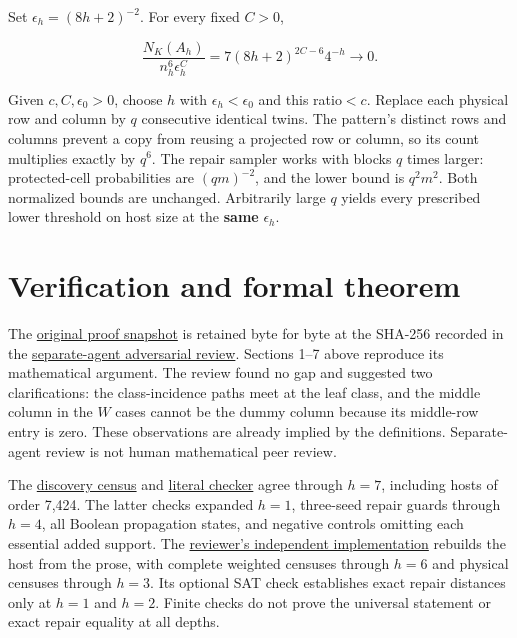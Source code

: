 \documentclass[11pt,letterpaper]{article}
\begin{document}
Set \(\epsilon _h=(8h+2)^{-2}\). For every fixed \(C>0\),

\[
 \frac{N_K(A_h)}{n_h^6\epsilon_h^C}
 =7(8h+2)^{2C-6}4^{-h}\longrightarrow0.
\]

Given \(c,C,\epsilon _{0}>0\), choose \(h\) with
\(\epsilon _h<\epsilon _{0}\) and this ratio\({}<c\). Replace each
physical row and column by \(q\) consecutive identical twins. The
pattern's distinct rows and columns prevent a copy from reusing a
projected row or column, so its count multiplies exactly by \(q^{6}\).
The repair sampler works with blocks \(q\) times larger: protected-cell
probabilities are \((qm)^{-2}\), and the lower bound is \(q^{2}m^{2}\).
Both normalized bounds are unchanged. Arbitrarily large \(q\) yields
every prescribed lower threshold on host size at the \textbf{same}
\(\epsilon _h\).

\section{Verification and formal
theorem}\label{verification-and-formal-theorem}

The
\href{https://github.com/shea256/ordered-binary-matrix-removal/blob/master/proofs/three-by-three.md}{original
proof snapshot} is retained byte for byte at the SHA-256 recorded in the
\href{https://github.com/shea256/ordered-binary-matrix-removal/blob/master/verification/reviews/three-by-three-adversarial.md}{separate-agent
adversarial review}. Sections 1--7 above reproduce its mathematical
argument. The review found no gap and suggested two clarifications: the
class-incidence paths meet at the leaf class, and the middle column in
the \(W\) cases cannot be the dummy column because its middle-row entry
is zero. These observations are already implied by the definitions.
Separate-agent review is not human mathematical peer review.

The
\href{https://github.com/shea256/ordered-binary-matrix-removal/blob/master/experiments/three_by_three_candidate.py}{discovery
census} and
\href{https://github.com/shea256/ordered-binary-matrix-removal/blob/master/verification/check_three_by_three.py}{literal
checker} agree through \(h=7\), including hosts of order 7,424. The
latter checks expanded \(h=1\), three-seed repair guards through
\(h=4\), all Boolean propagation states, and negative controls omitting
each essential added support. The
\href{https://github.com/shea256/ordered-binary-matrix-removal/blob/master/verification/check_three_by_three_reviewer.py}{reviewer's
independent implementation} rebuilds the host from the prose, with
complete weighted censuses through \(h=6\) and physical censuses through
\(h=3\). Its optional SAT check establishes exact repair distances only
at \(h=1\) and \(h=2\). Finite checks do not prove the universal
statement or exact repair equality at all depths.
\end{document}
